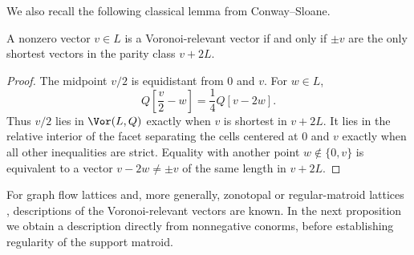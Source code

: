 \documentclass[11pt,letterpaper]{amsart}
\begin{document}
 We also recall the following classical lemma from Conway--Sloane.

\begin{lemma}\cite[Theorem 2]{CS}\label{lem:voronoi-parity}
A nonzero vector $v\in L$ is a  Voronoi-relevant vector if and only if $\pm v$ are the only shortest vectors in the parity class $v+2L$.
\end{lemma}

\begin{proof}
The midpoint $v/2$ is equidistant from $0$ and $v$.  For $w\in L$,
\[
  Q\left[\frac v2-w\right]=\frac14Q[v-2w].
\]
Thus $v/2$ lies in $\Vor(L,Q)$ exactly when $v$ is shortest in $v+2L$.  It lies in the relative interior of the facet separating the cells centered at $0$ and $v$ exactly when all other inequalities are strict. Equality with another point $w\notin\{0,v\}$ is equivalent to a vector $v-2w\ne\pm v$ of the same length in $v+2L$.
\end{proof}

For graph flow lattices \cite{amini2010lattice, bacher1997lattice} and, more generally, zonotopal \cite{vallentin2004note} or regular-matroid lattices \cite{dancsolim}, descriptions of the Voronoi-relevant vectors are known. In the next proposition we obtain a description directly from nonnegative conorms, before establishing regularity of the support matroid.
\end{document}
